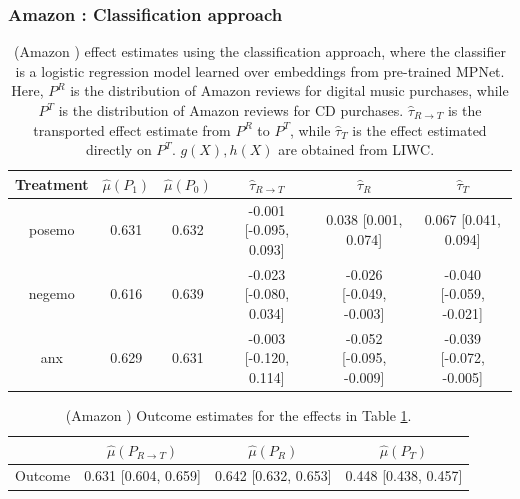 \documentclass{article}
\begin{document}
\newpage
\subsubsection{Amazon \cite{przyant2021causal}: Classification approach}

\begin{table}[!ht]
    \centering
    \begin{tabular}{c|ccccc}
    \toprule
    Treatment   &   $\hat{\mu}(P_1)$ &   $\hat{\mu}(P_0)$ & $\hat{\tau}_{R \rightarrow T}$   & $\hat{\tau}_R$          & $\hat{\tau}_T$          \\
    \midrule
    posemo      &              0.631 &              0.632 & -0.001 [-0.095, 0.093]           & 0.038 [0.001, 0.074]    & 0.067 [0.041, 0.094]    \\
    negemo      &              0.616 &              0.639 & -0.023 [-0.080, 0.034]           & -0.026 [-0.049, -0.003] & -0.040 [-0.059, -0.021] \\
    anx         &              0.629 &              0.631 & -0.003 [-0.120, 0.114]           & -0.052 [-0.095, -0.009] & -0.039 [-0.072, -0.005] \\
    \bottomrule
    \end{tabular}
    \caption{(Amazon \cite{przyant2021causal})  effect estimates using the classification approach, where the classifier is a logistic regression model learned over embeddings from pre-trained MPNet. Here, $P^R$ is the distribution of Amazon reviews for digital music purchases, while $P^T$ is the distribution of Amazon reviews for CD purchases. $\hat{\tau}_{R \rightarrow T}$ is the transported effect estimate from $P^R$ to $P^T$, while $\hat{\tau}_T$ is the effect estimated directly on $P^T$. $g(X), h(X)$ are obtained from LIWC.}
    \label{tab:results_clf_mpnet_amazon_pryzant}
\end{table}

\begin{table}[!ht]
    \centering
    \begin{tabular}{c|ccc}
    \toprule
     & $\hat{\mu}(P_{R \rightarrow T})$   & $\hat{\mu}(P_R)$     & $\hat{\mu}(P_T)$     \\
     \midrule
     Outcome & 0.631 [0.604, 0.659]               & 0.642 [0.632, 0.653] & 0.448 [0.438, 0.457] \\
    \bottomrule
    \end{tabular}
    \caption{(Amazon \cite{przyant2021causal}) Outcome estimates for the effects in Table \ref{tab:results_clf_mpnet_amazon_pryzant}.}
    \label{tab:results_clf_mpnet_amazon_pryzant_outcome}
\end{table}
\end{document}
